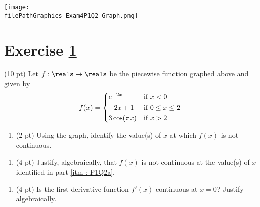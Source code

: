 %
%
%
%


\newpage

\begin{center}
\texttt{[image: \\filePathGraphics Exam4P1Q2\_Graph.png]}
\end{center}

\section{Exercise \ref{sec : Math112 Spring2022 FinalExam P1Q2}}
\label{sec : Math112 Spring2022 FinalExam P1Q2}

(10 pt) Let $f : \reals \rightarrow \reals$ be the piecewise function graphed above and given by
\begin{align*}
f(x)
=
\begin{dcases*}
e^{-2 x}		&	if $x < 0$			\\
-2 x + 1		&	if $0 \leq x \leq 2$	\\
3 \cos(\pi x)	&	if $x > 2$
\end{dcases*}
\end{align*}



\begin{enumerate}[label=(\alph*)]
\item\label{itm : P1Q2a} (2 pt) Using the graph, identify the value(s) of $x$ at which $f(x)$ is not continuous.
\end{enumerate}

\spaceSolution{0.5in}{%
}%



\begin{enumerate}[resume,label=(\alph*)]
\item\label{itm : P1Q2b} (4 pt) Justify, algebraically, that $f(x)$ is not continuous at the value(s) of $x$ identified in part \ref{itm : P1Q2a}.
\end{enumerate}

\spaceSolution{1.5in}{%
}%



\begin{enumerate}[resume,label=(\alph*)]
\item\label{itm : P1Q2c} (4 pt) Is the first-derivative function $f'(x)$ continuous at $x = 0$? Justify algebraically.
\end{enumerate}


